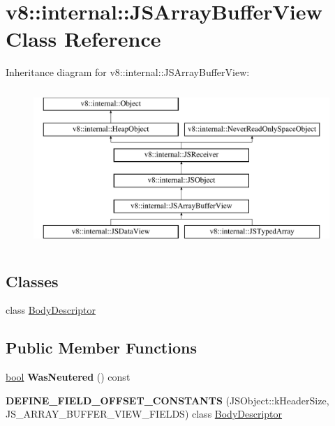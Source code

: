 \hypertarget{classv8_1_1internal_1_1JSArrayBufferView}{}\section{v8\+:\+:internal\+:\+:J\+S\+Array\+Buffer\+View Class Reference}
\label{classv8_1_1internal_1_1JSArrayBufferView}
Inheritance diagram for v8\+:\+:internal\+:\+:J\+S\+Array\+Buffer\+View\+:\begin{figure}[H]
\begin{center}
\leavevmode
\includegraphics[height=6.000000cm]{classv8_1_1internal_1_1JSArrayBufferView}
\end{center}
\end{figure}
\subsection*{Classes}
\begin{DoxyCompactItemize}
\item 
class \mbox{\hyperlink{classv8_1_1internal_1_1JSArrayBufferView_1_1BodyDescriptor}{Body\+Descriptor}}
\end{DoxyCompactItemize}
\subsection*{Public Member Functions}
\begin{DoxyCompactItemize}
\item 
\mbox{\label{classv8_1_1internal_1_1JSArrayBufferView_a9bbef9e652fc563a1ee8b5d6427bc700}} 
\mbox{\hyperlink{classbool}{bool}} {\bfseries Was\+Neutered} () const
\item 
\mbox{\label{classv8_1_1internal_1_1JSArrayBufferView_a96b84236727a8fc6aa723a56d26d2a41}} 
{\bfseries D\+E\+F\+I\+N\+E\+\_\+\+F\+I\+E\+L\+D\+\_\+\+O\+F\+F\+S\+E\+T\+\_\+\+C\+O\+N\+S\+T\+A\+N\+TS} (J\+S\+Object\+::k\+Header\+Size, J\+S\+\_\+\+A\+R\+R\+A\+Y\+\_\+\+B\+U\+F\+F\+E\+R\+\_\+\+V\+I\+E\+W\+\_\+\+F\+I\+E\+L\+DS) class \mbox{\hyperlink{classv8_1_1internal_1_1JSArrayBufferView_1_1BodyDescriptor}{Body\+Descriptor}}
\end{DoxyCompactItemize}
